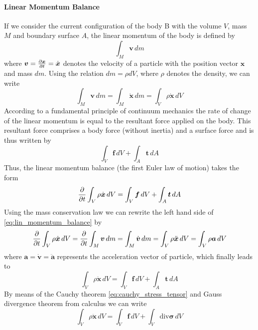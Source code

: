 \paragraph*{Linear Momentum Balance}
If we consider the current configuration of the body B with the volume \(V\), mass \(M\) and boundary surface \(A\), the linear momentum of the body is defined by 
\begin{equation}
    \int_{M}^{} \bm{v} \,dm 
\end{equation}
where \(\bm{v} = \pdv{\bm{x}}{t} = \dot{\bm{x}}\) denotes the velocity of a particle with the position vector \(\bm{x}\) and mass \(dm\). Using the relation \(dm = \rho dV\), where \(\rho\) denotes the density, we can write 
\begin{equation}
    \int_{M}^{} \bm{v} \,dm 
    =  \int_{M}^{} \dot{\bm{x}} \,dm 
    =  \int_{V}^{} \rho\dot{\bm{x}} \,dV 
\end{equation}
According to a fundamental principle of continuum mechanics the rate of change of the linear momentum is equal to the resultant force applied on the body. This resultant force comprises a body force (without inertia) and a surface force and is thus written by 
\begin{equation}
    \int_{V}^{} \bm{f} \,dV 
    + \int_{A}^{} \bm{t} \,dA
\end{equation}
Thus, the linear momentum balance (the first Euler law of motion) takes the form
\begin{equation}
    \pdv*{\int_{V}^{} \rho\dot{\bm{x}} \,dV }{t}
    = \int_{V}^{} \bm{f} \,dV 
    + \int_{A}^{} \bm{t} \,dA
    \label{eq:lin_momentum_balance}
\end{equation}
Using the mass conservation law we can rewrite the left hand side of \cref{eq:lin_momentum_balance} by
\begin{equation}
    \pdv*{\int_{V}^{} \rho\dot{\bm{x}} \,dV }{t} 
    = \pdv*{ \int_{M}^{} \bm{v} \,dm}{t} 
    =  \int_{M}^{} \dot{\bm{v}} \,dm 
    = \int_{V}^{} \rho\ddot{\bm{x}} \,dV
    = \int_{V}^{} \rho \bm{a} \,dV
\end{equation}
where \(\bm{a} = \dot{\bm{v}} = \ddot{\bm{a}}\) represents the acceleration vector of particle, which finally leads to 
\begin{equation}
    \int_{V}^{} \rho\ddot{\bm{x}} \,dV = \int_{V}^{} \bm{f} \,dV 
    + \int_{A}^{} \bm{t} \,dA
\end{equation}
By means of the Cauchy theorem \cref{eq:cauchy_stress_tensor} and Gauss divergence theorem from calculus we can write 
\begin{equation}
        \int_{V}^{} \rho\ddot{\bm{x}} \,dV
        = \int_{V}^{} \bm{f} \,dV 
        + \int_{V}^{} \text{div}\bm{\sigma} \,dV
\end{equation}

